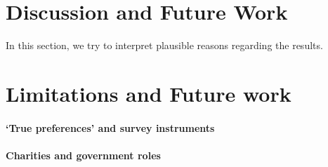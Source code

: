 \section{Discussion and Future Work}
\label{sec:discussion}

In this section, we try to interpret plausible reasons regarding the results.

\section{Limitations and Future work}
\label{sec:limitations}

\paragraph{`True preferences' and survey instruments}

\paragraph{Charities and government roles}
